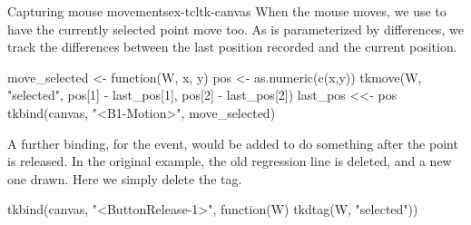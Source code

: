 \begin{example}{Capturing mouse movements}{ex-tcltk-canvas}
When the mouse moves, we use  to have the currently
selected point move too. As  is parameterized by
differences, we track the differences
between the last position recorded and the current position.
\begin{Schunk}
\begin{Sinput}
 move_selected <- function(W, x, y) {
   pos <- as.numeric(c(x,y))
   tkmove(W, "selected", pos[1] - last_pos[1], 
                         pos[2] - last_pos[2])
   last_pos <<- pos
 }
 tkbind(canvas, "<B1-Motion>", move_selected)
\end{Sinput}
\end{Schunk}
%
A further binding, for the  event, would be
added to do something after the point is released. In the original
example, the old regression line is deleted, and a new one drawn. Here
we simply delete the  tag.
\begin{Schunk}
\begin{Sinput}
 tkbind(canvas, "<ButtonRelease-1>", 
        function(W) tkdtag(W, "selected"))
\end{Sinput}
\end{Schunk}


\end{example}



